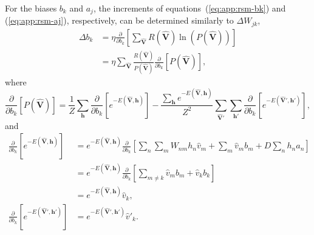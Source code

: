 For the biases $b_{k}$ and $a_{j}$, the increments of equations~(\ref{eq:app:rsm-bk}) and (\ref{eq:app:rsm-aj}), respectively, can be determined similarly to $\Delta W_{jk}$,
\begin{align}
    \Delta b_{k} &= \eta \frac{\partial}{\partial b_{k}} \left[ \sum_{\mathbf{\hat{V}}} R(\mathbf{\hat{V}}) \ln \left(P(\mathbf{\hat{V}}) \right) \right] \nonumber \\%
    \label{eq:app:rsm-bk-step1}
    &= \eta \sum_{\mathbf{\hat{V}}} \frac{R(\mathbf{\hat{V}})}{P(\mathbf{\hat{V}})} \frac{\partial}{\partial b_{k}} \left[ P(\mathbf{\hat{V}}) \right],
\end{align}
where 
\begin{equation}
    \label{eq:app:rsm-bk-step2}
    \frac{\partial}{\partial b_{k}} \left[ P(\mathbf{\hat{V}}) \right] = \frac{1}{Z} \sum_{\mathbf{h}} \frac{\partial}{\partial b_{k}} \left[ e^{-E(\mathbf{\hat{V}}, \mathbf{h})} \right] - \frac{\sum_{\mathbf{h}} e^{-E(\mathbf{\hat{V}}, \mathbf{h})}}{Z^{2}} \sum_{\mathbf{\hat{V}}'} \sum_{\mathbf{h}'} \frac{\partial}{\partial b_{k}} \left[ e^{-E(\mathbf{\hat{V}}', \mathbf{h}')} \right], 
\end{equation}
and
\begin{align}
    \frac{\partial}{\partial b_{k}} \left[ e^{-E(\mathbf{\hat{V}}, \mathbf{h})} \right] &=  e^{-E(\mathbf{\hat{V}}, \mathbf{h})} \frac{\partial}{\partial b_{k}} \left[ \sum_{n} \sum_{m} W_{nm} h_{n} \hat{v}_{m} + \sum_{m} \hat{v}_{m} b_{m} + D \sum_{n} h_{n} a_{n} \right] \nonumber \\%
    &= e^{-E(\mathbf{\hat{V}}, \mathbf{h})} \frac{\partial}{\partial b_{k}} \left[ \sum_{m \neq k} \hat{v}_{m} b_{m} + \hat{v}_{k} b_{k} \right] \nonumber \\%
    \label{eq:app:rsm-bk-step3}
    &= e^{-E(\mathbf{\hat{V}}, \mathbf{h})} \hat{v}_{k}, \\
    \label{eq:app:rsm-bk-step4}
    \frac{\partial}{\partial b_{k}} \left[ e^{-E(\mathbf{\hat{V}}', \mathbf{h}')} \right] &= e^{-E(\mathbf{\hat{V}}', \mathbf{h}')} \hat{v}'_{k}. 
\end{align}

